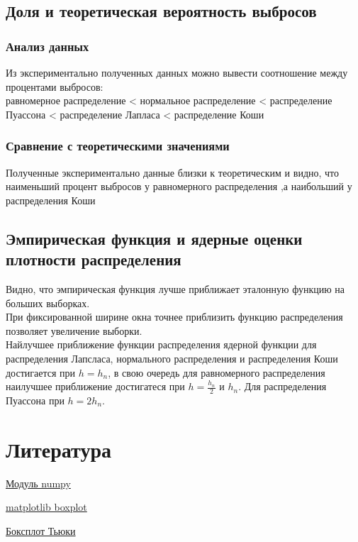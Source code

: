 \documentclass[a4]{article}
\begin{document}
		\subsection{Доля и теоретическая вероятность выбросов}
			\subsubsection{Анализ данных}
			Из экспериментально полученных данных можно вывести соотношение между процентами выбросов:\\
			равномерное распределение < нормальное распределение < распределение Пуассона < распределение Лапласа < распределение Коши
			\subsubsection{Сравнение с теоретическими значениями}
			Полученные экспериментально данные близки к теоретическим и видно, что наименьший процент выбросов у равномерного распределения ,а наибольший у распределения Коши
			
		\subsection{Эмпирическая функция и ядерные оценки плотности распределения}
			Видно, что эмпирическая функция лучше приближает эталонную функцию на больших выборках.\\
			
			При фиксированной ширине окна точнее приблизить функцию распределения позволяет увеличение выборки.\\
			
			Найлучшее приближение функции распределения ядерной функции для распределения Лапсласа, нормального распределения и распределения Коши достигается при $h =  h_n$, в свою очередь для равномерного распределения наилучшее приближение достигатеся при $ h = \frac{h_n}{2}$ и $h_n$. Для распределения Пуассона при $h = 2h_n$.
			
	\section{Литература}
	
	\href{https://physics.susu.ru/vorontsov/language/numpy.html}{Модуль numpy}
	
	\href{https://matplotlib.org/3.1.1/api/_as_gen/matplotlib.pyplot.boxplot.html}{matplotlib boxplot}
	
	\href{https://habr.com/ru/post/267123/}{Боксплот Тьюки}
	
\end{document}
